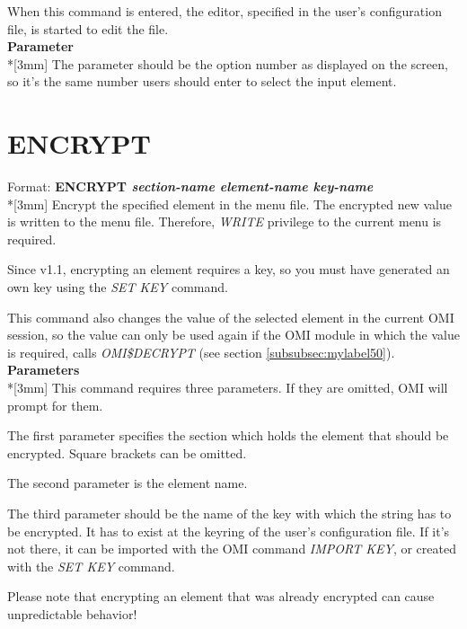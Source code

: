 \documentclass[a4paper]{book}
\newcommand{\vs}{\vspace{3mm}}
\renewcommand{\indent}{\hspace*{5mm}}
\begin{document}
When this command is entered, the editor, specified in the user's 
configuration file, is started to edit the file.\\[3mm]
\textbf{Parameter}\\*[3mm]
The parameter should be the option number as displayed on the screen, so 
it's the same number users should enter to select the input element.


\section{ENCRYPT}
\label{subsec:encrypt}

\indent Format: \textbf{ENCRYPT \textit{section-name element-name key-name}}\dag\\*[3mm]
Encrypt the specified element in the menu file. The encrypted new value is 
written to the menu file. Therefore, \textsl{WRITE} privilege to the current menu is 
required.

Since v1.1, encrypting an element requires a key, so you must have generated 
an own key using the \textsl{SET KEY} command.

\vs

This command also changes the value of the selected element in the current 
OMI session, so the value can only be used again if the OMI module in which 
the value is required, calls \textsl{OMI{\$}DECRYPT} (see section \ref{subsubsec:mylabel50}).\\[3mm]
\textbf{Parameters}\\*[3mm]
This command requires three parameters. If they are omitted, OMI will prompt 
for them.

\vs

The first parameter specifies the section which holds the element that 
should be encrypted. Square brackets can be omitted.

The second parameter is the element name.

The third parameter should be the name of the key with which the string has 
to be encrypted. It has to exist at the keyring of the user's configuration 
file. If it's not there, it can be imported with the OMI command \textsl{IMPORT KEY}, 
or created with the \textsl{SET KEY} command.

\vs

Please note that encrypting an element that was already encrypted can cause 
unpredictable behavior!
\end{document}
